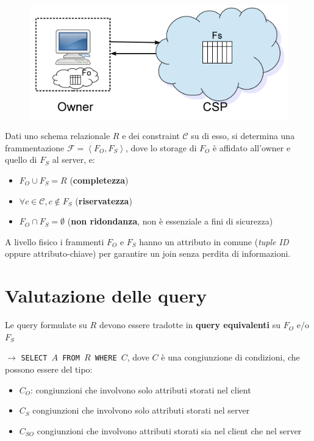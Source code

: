 \documentclass{report}
\begin{document}
\begin{figure}[ht]
    \centering
    \includegraphics[width=0.7\linewidth]{images/fragmentation/intro.png}
\end{figure}

Dati uno schema relazionale $R$ e dei constraint $\mathcal{C}$ su di esso, si 
determina una frammentazione $\mathcal{F} = \left\langle F_O, F_S \right\rangle$, dove lo storage di
$F_O$ è affidato all'owner e quello di $F_S$ al server, e:
\begin{itemize}
    \item $F_O \cup F_S = R$ (\textbf{completezza})
    \item $\forall c \in \mathcal{C}, c \notin F_S$ (\textbf{riservatezza})
    \item $F_O \cap F_S = \emptyset$ (\textbf{non ridondanza}, non è essenziale a fini di sicurezza)
\end{itemize}

A livello fisico i frammenti $F_O$ e $F_S$ hanno un attributo in comune (\textit{tuple ID} oppure attributo-chiave) 
per garantire un join senza perdita di informazioni. 

\section{Valutazione delle query}
Le query formulate su $R$ devono essere tradotte in \textbf{query equivalenti} su 
$F_O$ e/o $F_S$

$\rightarrow$ \texttt{SELECT $A$ FROM $R$ WHERE $C$}, dove $C$ è una congiunzione 
di condizioni, che possono essere del tipo:
\begin{itemize}
    \item $C_O$: congiunzioni che involvono solo attributi storati nel client 
    \item $C_S$ congiunzioni che involvono solo attributi storati nel server 
    \item $C_{SO}$ congiunzioni che involvono attributi storati sia nel client che nel server 
\end{itemize} 
\end{document}
